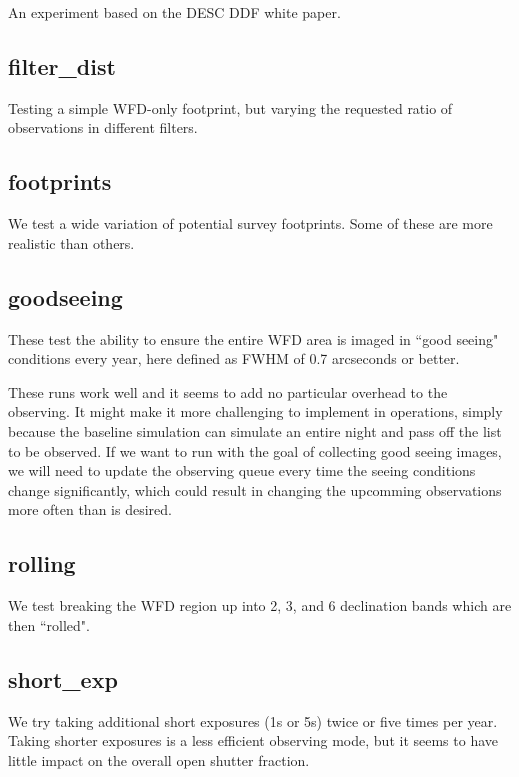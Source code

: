 An experiment based on the DESC DDF white paper.


\subsection{filter\_dist}

Testing a simple WFD-only footprint, but varying the requested ratio of observations in different filters.


\subsection{footprints}

We test a wide variation of potential survey footprints. Some of these are more realistic than others. 

\subsection{goodseeing}\label{ss:goodseeing}

These test the ability to ensure the entire WFD area is imaged in ``good seeing" conditions every year, here defined as FWHM of 0.7 arcseconds or better.  

These runs work well and it seems to add no particular overhead to the observing. It might make it more challenging to implement in operations, simply because the baseline simulation can simulate an entire night and pass off the list to be observed. If we want to run with the goal of collecting good seeing images, we will need to update the observing queue every time the seeing conditions change significantly, which could result in changing the upcomming observations more often than is desired.

\subsection{rolling}

We test breaking the WFD region up into 2, 3, and 6 declination bands which are then ``rolled". 

\subsection{short\_exp}

We try taking additional short exposures (1s or 5s) twice or five times per year. Taking shorter exposures is a less efficient observing mode, but it seems to have little impact on the overall open shutter fraction.

